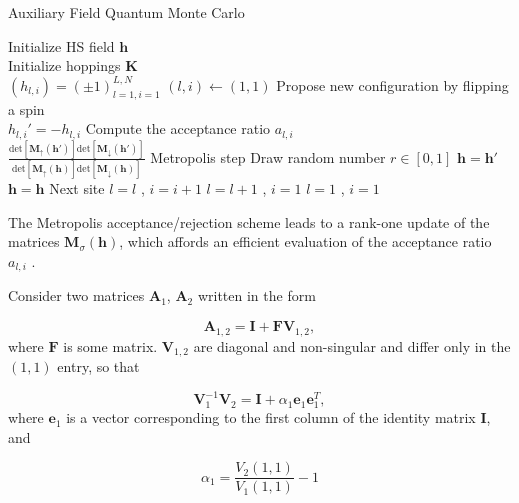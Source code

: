 \documentclass[10pt, twocolumn, twoside]{article}
\begin{document}
\begin{algorithm}
\caption{Auxiliary Field Quantum Monte Carlo}
\label{afqmcSampling}
\begin{multicols}{2}
\begin{algorithmic}[5]
  \STATE Initialize HS field $\bm h$  \\
  \STATE Initialize hoppings $\bm K$  \\
  \STATE  $(h_{l, i}) = (\pm 1)_{l=1, i = 1}^{L, N}$
  \STATE $(l, i) \leftarrow (1, 1)$
  \STATE \footnotesize{Propose new configuration by flipping a spin} \\ \normalsize{$h_{l, i}' = - h_{l, i}$} 
  \STATE \footnotesize{Compute the acceptance ratio $a_{l, i}$} \\
  \normalsize{$\frac{\text{det}[\bm M_\uparrow (\bm h')]\text{det}[\bm M_\downarrow (\bm h')]}{\text{det}[\bm M_\uparrow (\bm h)]\text{det}[\bm M_\downarrow (\bm h)]}$}
  \STATE \normalsize{Metropolis step}
  \STATE \footnotesize{Draw random number $r \in [0,1]$}
  \STATE $\bm h = \bm h'$
  \ELSE
  \STATE $\bm h = \bm h$
  \ENDIF
  \STATE Next site
  \STATE $l = l$ , $i = i +1 $
  \ELSE
  \STATE $l = l+1$ , $i = 1 $
  \ENDIF
  \STATE $l = 1$ , $i=1$
  \ENDIF
  \ENDIF
  \ENDFOR
\end{algorithmic}
\end{multicols}
\end{algorithm}

The Metropolis acceptance/rejection scheme leads to a rank-one update of the matrices $\bm M_\sigma (\bm h)$, which affords an efficient evaluation of the acceptance ratio $a_{l, i}$ \cite{Bai2006}.

Consider two matrices $\bm A_1$, $\bm A_2$ written in the form

\begin{equation}
\bm A_{1,2} = \bm I + \bm F \bm V_{1,2} ,
\end{equation}
where $\bm F$ is some matrix. $\bm V_{1,2}$ are diagonal and non-singular and differ only in the $(1,1)$ entry, so that

\begin{equation}
\bm V_1^{-1} \bm V_2 = \bm I + \alpha_1 \bm e_1 \bm e_1^T ,
\end{equation}
where $\bm e_1$ is a vector corresponding to the first column of the identity matrix $\bm I$, and

\begin{equation*}
\alpha_1 = \frac{V_2(1,1)}{V_1(1,1)} - 1
\end{equation*}
\end{document}
